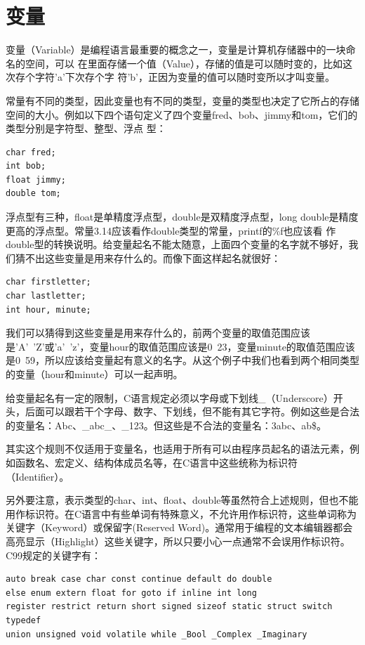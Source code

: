 \documentclass[12pt]{book}
\begin{document}
\section{变量}
变量（Variable）是编程语言最重要的概念之一，变量是计算机存储器中的一块命名的空间，可以
在里面存储一个值（Value），存储的值是可以随时变的，比如这次存个字符'a'下次存个字
符'b'，正因为变量的值可以随时变所以才叫变量。

常量有不同的类型，因此变量也有不同的类型，变量的类型也决定了它所占的存储空间的大小。例如以下四个语句定义了四个变量fred、bob、jimmy和tom，它们的类型分别是字符型、整型、浮点
型：
\begin{verbatim}
char fred;
int bob;
float jimmy;
double tom;
\end{verbatim}
浮点型有三种，float是单精度浮点型，double是双精度浮点型，long double是精度更高的浮点型。常量3.14应该看作double类型的常量，printf的\%f也应该看
作double型的转换说明。给变量起名不能太随意，上面四个变量的名字就不够好，我们猜不出这些变量是用来存什么的。而像下面这样起名就很好：
\begin{verbatim}
char firstletter;
char lastletter;
int hour, minute;
\end{verbatim}
我们可以猜得到这些变量是用来存什么的，前两个变量的取值范围应该是'A'~'Z'或'a'~'z'，变量hour的取值范围应该是0~23，变量minute的取值范围应该是0~59，所以应该给变量起有意义的名字。从这个例子中我们也看到两个相同类型的变量（hour和minute）可以一起声明。

给变量起名有一定的限制，C语言规定必须以字母或下划线\_（Underscore）开头，后面可以跟若干个字母、数字、下划线，但不能有其它字符。例如这些是合法的变量名：Abc、\_abc\_、\_123。但这些是不合法的变量名：3abc、ab\$。

其实这个规则不仅适用于变量名，也适用于所有可以由程序员起名的语法元素，例如函数名、宏定义、结构体成员名等，在C语言中这些统称为标识符（Identifier）。

另外要注意，表示类型的char、int、float、double等虽然符合上述规则，但也不能用作标识符。在C语言中有些单词有特殊意义，不允许用作标识符，这些单词称为关键字（Keyword）或保留字(Reserved Word)。通常用于编程的文本编辑器都会高亮显示（Highlight）这些关键字，所以只要小心一点通常不会误用作标识符。C99规定的关键字有：
\begin{verbatim}
auto break case char const continue default do double
else enum extern float for goto if inline int long
register restrict return short signed sizeof static struct switch typedef
union unsigned void volatile while _Bool _Complex _Imaginary
\end{verbatim}
\end{document}
